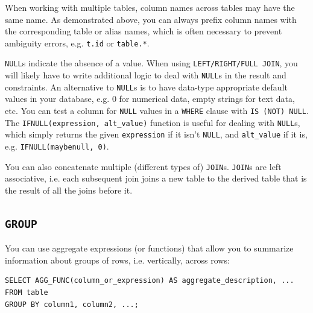 \documentclass[table, xcdraw]{article}%
\begin{document}
When working with multiple tables, column names across tables may have the same name. As demonstrated above, you can always prefix column names with the corresponding table or alias names, which is often necessary to prevent ambiguity errors, e.g. \texttt{t.id} or \texttt{table.*}.

\texttt{NULL}s indicate the absence of a value. When using \texttt{LEFT/RIGHT/FULL JOIN}, you will likely have to write additional logic to deal with \texttt{NULL}s in the result and constraints. An alternative to \texttt{NULL}s is to have data-type appropriate default values in your database, e.g. 0 for numerical data, empty strings for text data, etc. You can test a column for \texttt{NULL} values in a \texttt{WHERE} clause with \texttt{IS (NOT) NULL}. The \texttt{IFNULL(expression, alt_value)} function is useful for dealing with \texttt{NULL}s, which simply returns the given \texttt{expression} if it isn't \texttt{NULL}, and \texttt{alt_value} if it is, e.g. \texttt{IFNULL(maybenull, 0)}.

You can also concatenate multiple (different types of) \texttt{JOIN}s. \texttt{JOIN}s are left associative, i.e. each subsequent join joins a new table to the derived table that is the result of all the joins before it.

\subsection{\texttt{GROUP}}

You can use aggregate expressions (or functions) that allow you to summarize information about groups of rows, i.e. vertically, across rows:

\begin{verbatim}
SELECT AGG_FUNC(column_or_expression) AS aggregate_description, ...
FROM table
GROUP BY column1, column2, ...;
\end{verbatim}
\end{document}

